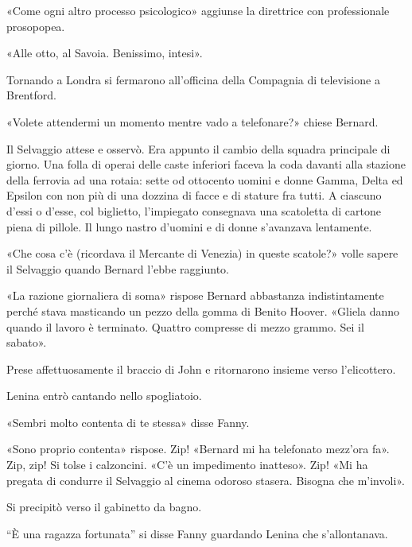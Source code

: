 \documentclass[
a5paper, %
10pt, %
twoside, 
onecolumn, %
openany, %
]{memoir}
\begin{document}
«Come ogni altro processo psicologico» aggiunse la direttrice con professionale prosopopea.

«Alle otto, al Savoia. Benissimo, intesi».

Tornando a Londra si fermarono all’officina della Compagnia di televisione a Brentford.

«Volete attendermi un momento mentre vado a telefonare?» chiese Bernard.

Il Selvaggio attese e osservò. Era appunto il cambio della squadra principale di giorno. Una folla di operai delle caste inferiori faceva la coda davanti alla stazione della ferrovia ad una rotaia: sette od ottocento uomini e donne Gamma, Delta ed Epsilon con non più di una dozzina di facce e di stature fra tutti. A ciascuno d’essi o d’esse, col biglietto, l’impiegato consegnava una scatoletta di cartone piena di pillole. Il lungo nastro d’uomini e di donne s’avanzava lentamente.

«Che cosa c’è (ricordava il Mercante di Venezia) in queste scatole?» volle sapere il Selvaggio quando Bernard l’ebbe raggiunto.

«La razione giornaliera di soma» rispose Bernard abbastanza indistintamente perché stava masticando un pezzo della gomma di Benito Hoover. «Gliela danno quando il lavoro è terminato. Quattro compresse di mezzo grammo. Sei il sabato».

Prese affettuosamente il braccio di John e ritornarono insieme verso l’elicottero.

Lenina entrò cantando nello spogliatoio.

«Sembri molto contenta di te stessa» disse Fanny.

«Sono proprio contenta» rispose. Zip! «Bernard mi ha telefonato mezz’ora fa». Zip, zip! Si tolse i calzoncini. «C’è un impedimento inatteso». Zip! «Mi ha pregata di condurre il Selvaggio al cinema odoroso stasera. Bisogna che m’involi».

Si precipitò verso il gabinetto da bagno.

“È una ragazza fortunata” si disse Fanny guardando Lenina che s’allontanava.
\end{document}
